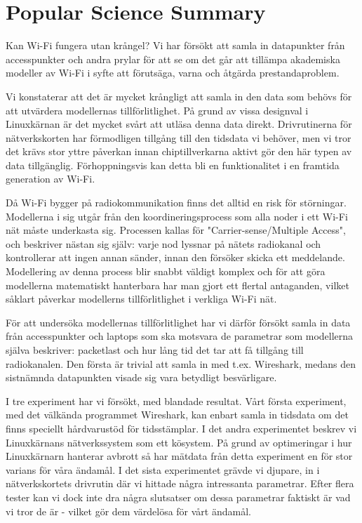 
\chapter*{Popular Science Summary}


Kan Wi-Fi fungera utan krångel? Vi har försökt att samla in datapunkter från
accesspunkter och andra prylar för att se om det går att tillämpa akademiska
modeller av Wi-Fi i syfte att förutsäga, varna och åtgärda prestandaproblem. 

Vi konstaterar att det är mycket krångligt att samla in den data som behövs
för att utvärdera modellernas tillförlitlighet. På grund av vissa designval i
Linuxkärnan är det mycket svårt att utläsa denna data direkt. Drivrutinerna
för nätverkskorten har förmodligen tillgång till den tidsdata vi behöver, men 
vi tror det krävs stor yttre påverkan innan chiptillverkarna aktivt gör den här
typen av data tillgänglig. Förhoppningsvis kan detta bli en funktionalitet i
en framtida generation av Wi-Fi.

Då Wi-Fi bygger på radiokommunikation finns det alltid en risk för störningar.
Modellerna i sig utgår från den koordineringsprocess som alla noder i ett
Wi-Fi nät måste underkasta sig. Processen kallas för "Carrier-sense/Multiple
Access", och beskriver nästan sig själv: varje nod lyssnar på nätets
radiokanal och kontrollerar att ingen annan sänder, innan den försöker skicka
ett meddelande. Modellering av denna process blir snabbt väldigt komplex och
för att göra modellerna matematiskt hanterbara har man gjort ett flertal
antaganden, vilket såklart påverkar modellerns tillförlitlighet i verkliga
Wi-Fi nät.

För att undersöka modellernas tillförlitlighet har vi därför försökt samla in
data från accesspunkter och laptops som ska motsvara de parametrar som
modellerna själva beskriver: packetlast och hur lång tid det tar att få
tillgång till radiokanalen. Den första är trivial att samla in med t.ex.
Wireshark, medans den sistnämnda datapunkten visade sig vara betydligt
besvärligare.

I tre experiment har vi försökt, med blandade resultat. Vårt första
experiment, med det välkända programmet Wireshark, kan enbart samla in
tidsdata om det finns speciellt hårdvarustöd för tidsstämplar. I det andra
experimentet beskrev vi Linuxkärnans nätverkssystem som ett kösystem. På
grund av optimeringar i hur Linuxkärnarn hanterar avbrott så har mätdata från
detta experiment en för stor varians för våra ändamål. I det sista
experimentet grävde vi djupare, in i nätverkskortets drivrutin där vi hittade
några intressanta parametrar. Efter flera tester kan vi dock inte dra några
slutsatser om dessa parametrar faktiskt är vad vi tror de är - vilket gör dem
värdelösa för vårt ändamål.

